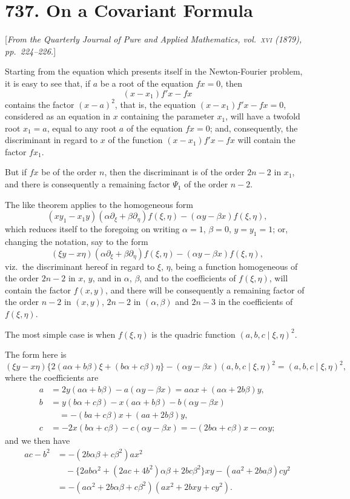\documentclass[11pt,a4paper]{book}
\begin{document}
\section*{737. On a Covariant Formula}

[\textit{From the Quarterly Journal of Pure and Applied Mathematics, vol.~\textsc{xvi} (1879),
pp.~224--226.}]

Starting from the equation which presents itself in the Newton-Fourier
problem, it is easy to see that, if $a$ be a root of the equation $fx=0$, then
\[
(x-x_1)f'x - fx
\]
contains the factor $(x-a)^2$, that is, the equation $(x-x_1)f'x-fx=0$,
considered as an equation in $x$ containing the parameter $x_1$, will have a
twofold root $x_1=a$, equal to any root $a$ of the equation $fx=0$; and,
consequently, the discriminant in regard to $x$ of the function
$(x-x_1)f'x-fx$ will contain the factor $fx_1$.

But if $fx$ be of the order $n$, then the discriminant is of the order
$2n-2$ in $x_1$, and there is consequently a remaining factor $\Psi_1$ of the
order $n-2$.

The like theorem applies to the homogeneous form
\[
(xy_1-x_1y)(\alpha\partial_\xi+\beta\partial_\eta)f(\xi,\eta)
-(\alpha y-\beta x)f(\xi,\eta),
\]
which reduces itself to the foregoing on writing $\alpha=1$, $\beta=0$, $y=y_1=1$;
or, changing the notation, say to the form
\[
(\xi y - x\eta)(\alpha\partial_\xi + \beta\partial_\eta)f(\xi,\eta)
-(\alpha y - \beta x)f(\xi,\eta),
\]
viz.~the discriminant hereof in regard to $\xi$, $\eta$, being a function homogeneous
of the order $2n-2$ in $x$, $y$, and in $\alpha$, $\beta$, and to the coefficients
of $f(\xi,\eta)$, will contain the factor $f(x,y)$, and there will be consequently
a remaining factor of the order $n-2$ in $(x,y)$, $2n-2$ in $(\alpha,\beta)$
and $2n-3$ in the coefficients of $f(\xi,\eta)$.

The most simple case is when $f(\xi,\eta)$ is the quadric function
$(a,b,c\mid\xi,\eta)^2$.

The form here is
\[
(\xi y - x\eta)\{2(a\alpha+b\beta)\xi+(b\alpha+c\beta)\eta\}
-(\alpha y-\beta x)(a,b,c\mid\xi,\eta)^2
= (a,b,c\mid\xi,\eta)^2,
\]
where the coefficients are
\begin{align*}
a &= 2y(a\alpha+b\beta)-a(\alpha y-\beta x)
= a\alpha x + (a\alpha+2b\beta)y,\\
b &= y(b\alpha+c\beta)-x(a\alpha+b\beta)-b(\alpha y-\beta x)\\
&\quad = -(ba+c\beta)x+(aa+2b\beta)y,\\
c &= -2x(b\alpha+c\beta)-c(\alpha y-\beta x)
= -(2b\alpha+c\beta)x-c\alpha y;
\end{align*}
and we then have
\begin{align*}
ac-b^2 &= -(2b\alpha\beta+c\beta^2)ax^2\\
&\quad -\{2ab\alpha^2+(2ac+4b^2)\alpha\beta+2bc\beta^2\}xy
- (aa^2+2ba\beta)cy^2\\
&= -(a\alpha^2+2b\alpha\beta+c\beta^2)(ax^2+2bxy+cy^2).
\end{align*}
\end{document}

